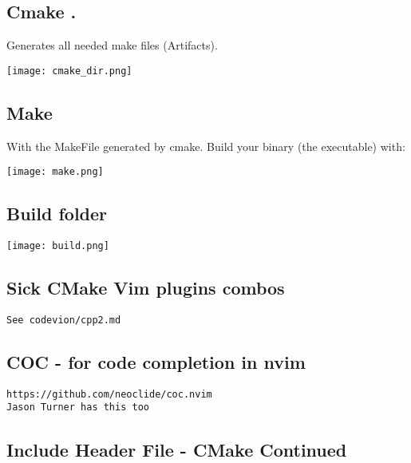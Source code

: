\subsection{Cmake .  }

Generates all needed make files (Artifacts).

\begin{center}
    \texttt{[image: cmake\_dir.png]}
\end{center}

\subsection{Make}

With the MakeFile generated by cmake. Build your binary (the executable) with:

\begin{center}
    \texttt{[image: make.png]}
\end{center}

\subsection{Build folder}

\begin{center}
    \texttt{[image: build.png]}
\end{center}

\subsection{Sick CMake Vim plugins combos}

\begin{verbatim}
See codevion/cpp2.md
\end{verbatim}

\subsection{COC - for code completion in nvim}
\begin{verbatim}
https://github.com/neoclide/coc.nvim
Jason Turner has this too
\end{verbatim}

\subsection{Include Header File - CMake Continued}

